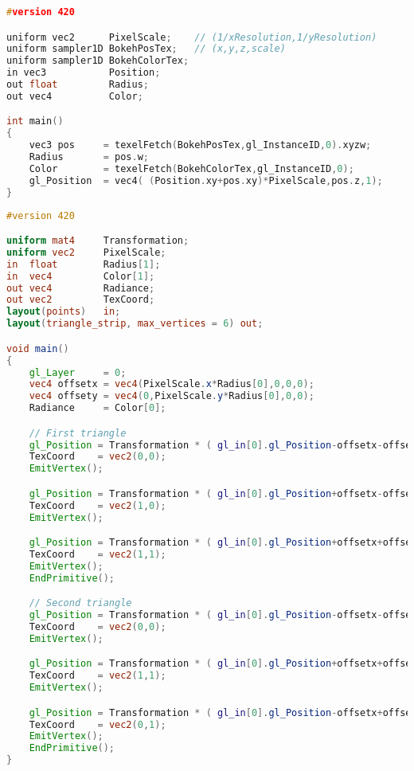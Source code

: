\begin{lstlisting}[language=C++,float={htb},caption={Vertex shader for rendering bokeh.},label={YourName:listing1}]
#version 420

uniform vec2      PixelScale;    // (1/xResolution,1/yResolution)
uniform sampler1D BokehPosTex;   // (x,y,z,scale)
uniform sampler1D BokehColorTex;
in vec3           Position;
out float         Radius;
out vec4          Color;

int main()
{
	vec3 pos     = texelFetch(BokehPosTex,gl_InstanceID,0).xyzw;
	Radius       = pos.w;
	Color        = texelFetch(BokehColorTex,gl_InstanceID,0);
	gl_Position	 = vec4( (Position.xy+pos.xy)*PixelScale,pos.z,1);
}
\end{lstlisting}

\begin{lstlisting}[language=GLSL,float={htb},caption={Geometry shader for rendering bokeh.},label={YourName:listing1}]
#version 420

uniform mat4     Transformation;
uniform vec2     PixelScale;
in  float        Radius[1];
in  vec4         Color[1];
out vec4         Radiance;
out vec2         TexCoord;
layout(points)   in;
layout(triangle_strip, max_vertices = 6) out;

void main()
{
	gl_Layer     = 0;
	vec4 offsetx = vec4(PixelScale.x*Radius[0],0,0,0);
	vec4 offsety = vec4(0,PixelScale.y*Radius[0],0,0);
	Radiance     = Color[0];

	// First triangle
	gl_Position = Transformation * ( gl_in[0].gl_Position-offsetx-offsety);
	TexCoord    = vec2(0,0);
	EmitVertex();

	gl_Position = Transformation * ( gl_in[0].gl_Position+offsetx-offsety);
	TexCoord    = vec2(1,0);
	EmitVertex();

	gl_Position = Transformation * ( gl_in[0].gl_Position+offsetx+offsety);
	TexCoord    = vec2(1,1);
	EmitVertex();
	EndPrimitive();

	// Second triangle
	gl_Position = Transformation * ( gl_in[0].gl_Position-offsetx-offsety);
	TexCoord    = vec2(0,0);
	EmitVertex();

	gl_Position = Transformation * ( gl_in[0].gl_Position+offsetx+offsety);
	TexCoord    = vec2(1,1);
	EmitVertex();

	gl_Position = Transformation * ( gl_in[0].gl_Position-offsetx+offsety);
	TexCoord    = vec2(0,1);
	EmitVertex();
	EndPrimitive();
}
\end{lstlisting}

